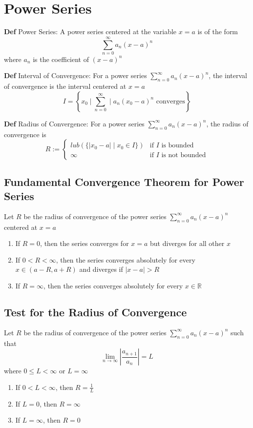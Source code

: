 \documentclass[11pt,notitlepage]{report}
\begin{document}
\chapter{Power Series}


\textbf{Def} Power Series: A power series centered at the variable $x = a$ is of the form
$$\sum_{n=0}^\infty a_n(x-a)^n$$
where $a_n$ is the coefficient of $(x-a)^n$


\textbf{Def} Interval of Convergence: For a power series $\sum^\infty_{n=0} a_n(x-a)^n$, the interval of convergence is the interval centered at $x=a$
$$I = \left\{x_0 \mid \sum_{n=0}^\infty \mid a_n(x_0 - a)^n \text{ converges}\right\}$$

\textbf{Def} Radius of Convergence: For a power series $\sum^\infty_{n=0} a_n(x-a)^n$, the radius of convergence is
$$R := \begin{cases}lub(\{|x_0 - a| \mid x_0 \in I\}) & \text{if $I$ is bounded}\\ \infty & \text{if $I$ is not bounded}\end{cases}$$

\section{Fundamental Convergence Theorem for Power Series}Let $R$ be the radius of convergence of the power series $\sum_{n=0}^\infty a_n(x-a)^n$ centered at $x=a$
\begin{enumerate}
    \item If $R = 0$, then the series converges for $x = a$ but diverges for all other $x$
    \item If $0 < R < \infty$, then the series converges absolutely for every $x \in (a-R, a+R)$ and diverges if $|x - a| > R$
    \item If $R = \infty$, then the series converges absolutely for every $x \in \mathbb R$
\end{enumerate}

\newpage 
\section{Test for the Radius of Convergence}Let $R$ be the radius of convergence of the power series $\sum_{n=0}^\infty a_n(x-a)^n$ such that
$$\lim_{n \to \infty} \left|\frac{a_{n+1}}{a_n}\right| = L$$
where $0 \leq L < \infty$ or $L = \infty$
\begin{enumerate}
    \item If $0 < L < \infty$, then $R = \frac{1}{L}$
    \item If $L = 0$, then $R = \infty$
    \item If $L= \infty$, then $R = 0$
\end{enumerate}
\end{document}
